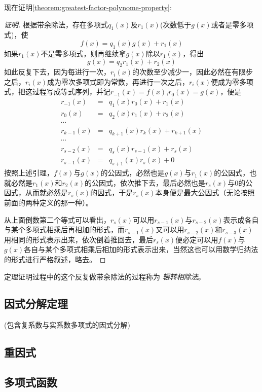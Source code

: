 现在证明\autoref{theorem:greatest-factor-polynome-property}:
\begin{proof}[证明]
  根据带余除法，存在多项式$q_1(x)$及$r_1(x)$(次数低于$g(x)$或者是零多项式)，使
  \[ f(x)=q_1(x)g(x)+r_1(x) \]
  如果$r_1(x)$不是零多项式，则再继续拿$g(x)$除以$r_1(x)$，得出
  \[ g(x) = q_2r_1(x)+r_2(x) \]
  如此反复下去，因为每进行一次，$r_i(x)$的次数至少减少一，因此必然在有限步之后，$r_i(x)$成为零次多项式即为常数，再进行一次之后，$r_i(x)$便成为零多项式，把这过程写成等式序列，并记$r_{-1}(x)=f(x)$,$r_0(x)=g(x)$，便是
  \begin{eqnarray*}
    r_{-1}(x) & = & q_1(x)r_0(x)+r_1(x) \\
    r_0(x) & = & q_2(x)r_1(x)+r_2(x) \\
    \cdots \\
    r_{k-1}(x) & = & q_{k+1}(x)r_k(x)+r_{k+1}(x) \\
    \cdots \\
    r_{s-2}(x) & = & q_s(x)r_{s-1}(x) + r_s(x) \\
    r_{s-1}(x) & = & q_{s+1}(x)r_s(x) + 0
  \end{eqnarray*}
  按照上述引理，$f(x)$与$g(x)$的公因式，必然也是$g(x)$与$r_1(x)$的公因式，也就必然是$r_1(x)$和$r_2(x)$的公因式，依次推下去，最后必然也是$r_s(x)$与0的公因式，从而就必然是$r_s(x)$的因式，于是$r_s(x)$本身便是最大公因式（无论按照前面的两种定义的那一种）。

  从上面倒数第二个等式可以看出，$r_s(x)$可以用$r_{s-1}(x)$与$r_{s-2}(x)$表示成各自与某个多项式相乘后再相加的形式，而$r_{s-1}(x)$又可以用$r_{s-2}(x)$和$r_{s-3}(x)$用相同的形式表示出来，依次倒着推回去，最后$r_s(x)$便必定可以用$f(x)$与$g(x)$各自与某个多项式相乘后相加的形式表示出来，当然这也可以用数学归纳法的形式进行严格叙述，略去。
\end{proof}

定理证明过程中的这个反复做带余除法的过程称为 \emph{辗转相除法}。

\subsection{因式分解定理}
\label{sec:factoring-theorem}

(包含复系数与实系数多项式的因式分解)

\subsection{重因式}
\label{sec:mulitple-factor}

\subsection{多项式函数}
\label{sec:polynome-function}

